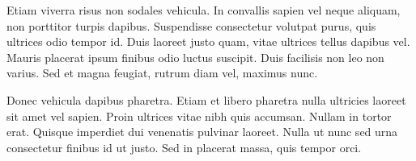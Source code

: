 \begin{anexosenv}
Etiam viverra risus non sodales vehicula. In convallis sapien vel neque aliquam, non porttitor turpis dapibus. Suspendisse consectetur volutpat purus, quis ultrices odio tempor id. Duis laoreet justo quam, vitae ultrices tellus dapibus vel. Mauris placerat ipsum finibus odio luctus suscipit. Duis facilisis non leo non varius. Sed et magna feugiat, rutrum diam vel, maximus nunc.

Donec vehicula dapibus pharetra. Etiam et libero pharetra nulla ultricies laoreet sit amet vel sapien. Proin ultrices vitae nibh quis accumsan. Nullam in tortor erat. Quisque imperdiet dui venenatis pulvinar laoreet. Nulla ut nunc sed urna consectetur finibus id ut justo. Sed in placerat massa, quis tempor orci.


\end{anexosenv}